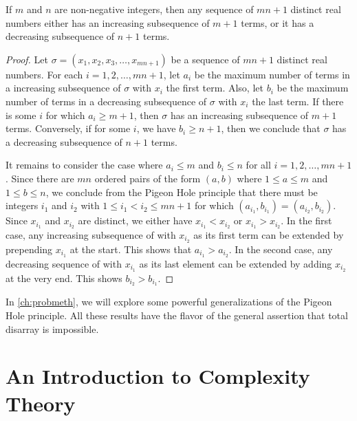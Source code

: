 \begin{theorem}\label{thm:ErdosSzekeres}
If $m$ and $n$ are non-negative integers, then 
any sequence of $mn+1$ distinct real numbers 
either has an increasing subsequence of $m+1$ terms, or it has a 
decreasing subsequence of $n+1$ terms.
\end{theorem}
\begin{proof}
Let $\sigma=(x_1,x_2,x_3,\dots,x_{mn+1})$ be a sequence of
$mn+1$ distinct real numbers.  For each $i=1,2,\dots,mn+1$, let $a_i$ be the
maximum number of terms in a increasing subsequence of
$\sigma$ with $x_i$ the first term.  Also, let $b_i$ be the maximum number
of terms in a decreasing subsequence of $\sigma$ with $x_i$
the last term.  If there is some $i$ for which $a_i\ge m+1$, then
$\sigma$ has an increasing subsequence of $m+1$ terms.  Conversely, if
for some $i$, we have $b_i\ge n+1$, then we conclude that $\sigma$ has
a decreasing subsequence of $n+1$ terms.

It remains to consider the case where $a_i\le m$ and $b_i\le n$ for all
$i=1,2,\dots,mn+1$.  Since there are $mn$ ordered pairs of the form
$(a,b)$ where $1\le a\le m$ and $1\le b\le n$, we conclude from the
Pigeon Hole principle that there must be integers $i_1$ and $i_2$ with
$1\le i_1<i_2\le mn+1$ for which $(a_{i_1},b_{i_1})=(a_{i_2},b_{i_2})$.
Since $x_{i_1}$ and $x_{i_2}$ are distinct, we either have $x_{i_1}<x_{i_2}$
or $x_{i_1}>x_{i_2}$.  In the first case, any increasing subsequence of 
with $x_{i_2}$ as its first term can be extended by prepending
$x_{i_1}$ at the start.  This shows that $a_{i_1}>a_{i_2}$.  
In the second case, any decreasing sequence of with $x_{i_1}$ as its last 
element can be extended by adding $x_{i_2}$ at the very end.  This
shows $b_{i_2}>b_{i_1}$.
\end{proof}

In \autoref{ch:probmeth}, we will explore some powerful
generalizations of the Pigeon Hole principle.  All these results have
the flavor of the general assertion that total disarray is impossible.

\section{An Introduction to Complexity Theory}\label{s:basics:complexity}

